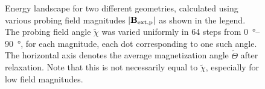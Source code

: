 \documentclass[11pt,a4paper,english]{article}
\begin{document}
\begin{figure}
\begin{subfigure}[b]{0.8\textwidth}
         \label{fig:barrierLandscape-sweepBext_r0.482}
     \end{subfigure}
    \caption{Energy landscape for two different geometries, calculated using various probing field magnitudes $\abs{\vb{B_\mathrm{ext,p}}}$ as shown in the legend. The probing field angle $\widetilde{\chi}$ was varied uniformly in 64 steps from \SIrange{0}{90}{\degree}, for each magnitude, each dot corresponding to one such angle. The horizontal axis denotes the average magnetization angle $\widetilde{\Theta}$ after relaxation. Note that this is not necessarily equal to $\widetilde{\chi}$, especially for low field magnitudes.}
    \label{fig:barrierLandscape-sweepBext}
\end{figure}

\end{document}
